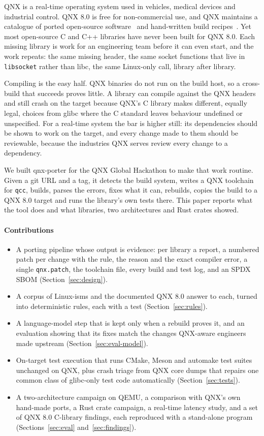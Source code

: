 \documentclass[conference]{IEEEtran}
\begin{document}
QNX is a real-time operating system used in vehicles, medical devices and industrial control. QNX 8.0 is free
for non-commercial use, and QNX maintains a catalogue of ported open-source software~\cite{ossqnx} and
hand-written build recipes~\cite{qnxports}. Yet most open-source C and C++ libraries have never been built for
QNX 8.0. Each missing library is work for an engineering team before it can even start, and the work repeats:
the same missing header, the same socket functions that live in \texttt{libsocket} rather than libc, the same
Linux-only call, library after library.

Compiling is the easy half. QNX binaries do not run on the build host, so a cross-build that succeeds proves
little. A library can compile against the QNX headers and still crash on the target because QNX's C library makes
different, equally legal, choices from glibc where the C standard leaves behaviour undefined or
unspecified. For a real-time system the bar is higher still: its dependencies should be shown to work on the
target, and every change made to them should be reviewable, because the industries QNX serves review every
change to a dependency.

We built qnx-porter for the QNX Global Hackathon to make that work routine. Given a git URL and a tag, it
detects the build system, writes a QNX toolchain for \texttt{qcc}, builds, parses the errors, fixes what it can,
rebuilds, copies the build to a QNX 8.0 target and runs the library's own tests there. This paper reports what
the tool does and what  libraries, two architectures and  Rust crates showed.

\paragraph{Contributions}
\begin{itemize}
\item A porting pipeline whose output is evidence: per library a report, a numbered patch per change with the
rule, the reason and the exact compiler error, a single \texttt{qnx.patch}, the toolchain file, every build and
test log, and an SPDX SBOM (Section~\ref{sec:design}).
\item A corpus of  Linux-isms and the documented QNX 8.0 answer to each, turned into deterministic
rules, each with a test (Section~\ref{sec:rules}).
\item A language-model step that is kept only when a rebuild proves it, and an evaluation showing that its fixes
match the changes QNX-aware engineers made upstream (Section~\ref{sec:eval-model}).
\item On-target test execution that runs CMake, Meson and automake test suites unchanged on QNX, plus crash
triage from QNX core dumps that repairs one common class of glibc-only test code automatically
(Section~\ref{sec:tests}).
\item A two-architecture campaign on QEMU, a comparison with QNX's own hand-made ports, a Rust crate campaign,
a real-time latency study, and a set of QNX 8.0 C-library findings, each reproduced with a stand-alone program
(Sections~\ref{sec:eval} and~\ref{sec:findings}).
\end{itemize}
\end{document}
